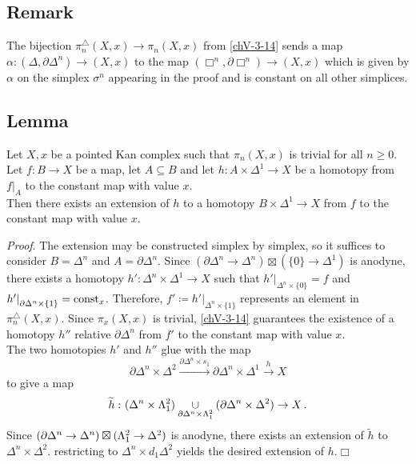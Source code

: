     \subsection{Remark}\label{chV-3-15}
        The bijection $\pi^{\triangle}_n(X, x) \to \pi_n(X, x)$ from \ref{chV-3-14} sends a map $\alpha \colon (\Delta, \partial \Delta^n) \to (X, x)$ to the map $(\Box^n, \partial \Box^n) \to (X, x)$ which is given by $\alpha$ on the simplex $\sigma^n$ appearing in the proof and is constant on all other simplices.

    \subsection{Lemma}\label{chV-3-16}
        Let $X, x$ be a pointed Kan complex such that $\pi_n(X, x)$ is trivial for all $n \geq 0$. Let $f \colon B \to X$ be a map, let $A \subseteq B$ and let $h \colon A \times \Delta^1 \to X$ be a homotopy from ${f|}_A$ to the constant map with value $x$.\\
        Then there exists an extension of $h$ to a homotopy $B \times \Delta^1 \to X$ from $f$ to the constant map with value $x$.
        \smallskip

        \emph{Proof}. The extension may be constructed simplex by simplex, so it suffices to consider $B = \Delta^n$ and $A = \partial \Delta^n$. Since $(\partial \Delta^n \to \Delta^n) \boxtimes (\{0\} \to \Delta^1)$ is anodyne, there exists a homotopy $h' \colon \Delta^n \times \Delta^1 \to X$ such that ${h'|}_{\Delta^n \times \{0\}} = f$ and ${h'|}_{\partial \Delta^n \times \{1\}} = \operatorname{const}_x$. Therefore, $f' \coloneq {h'|}_{\Delta^n \times \{1\}}$ represents an element in $\pi^{\triangle}_n(X, x)$. Since $\pi_x(X, x)$ is trivial, \ref{chV-3-14} guarantees the existence of a homotopy $h''$ relative $\partial \Delta^n$ from $f'$ to the constant map with value $x$.\\
        The two homotopies $h'$ and $h''$ glue with the map
        \begin{equation*}
            \partial \Delta^n \times \Delta^2 \xrightarrow{\partial \Delta^n \times s_1} \partial \Delta^n \times \Delta^1 \xrightarrow{h} X
        \end{equation*}
        to give a map
        \begin{equation*}
            \widetilde{h} \,\colon (\Delta^n \times \Lambda^{2}_{1}) \underset{\partial \Delta^n \times \Lambda^{2}_{1}}{\cup} (\partial \Delta^n \times \Delta^2) \to X \,.
        \end{equation*}
        Since $(\partial \Delta^n \to \Delta^n) \boxtimes (\Lambda^{2}_{1} \to \Delta^2)$ is anodyne, there exists an extension of $\widetilde{h}$ to $\Delta^n \times \Delta^2$. restricting to $\Delta^n \times d_1 \Delta^2$ yields the desired extension of $h$.\hfill$\Box$

